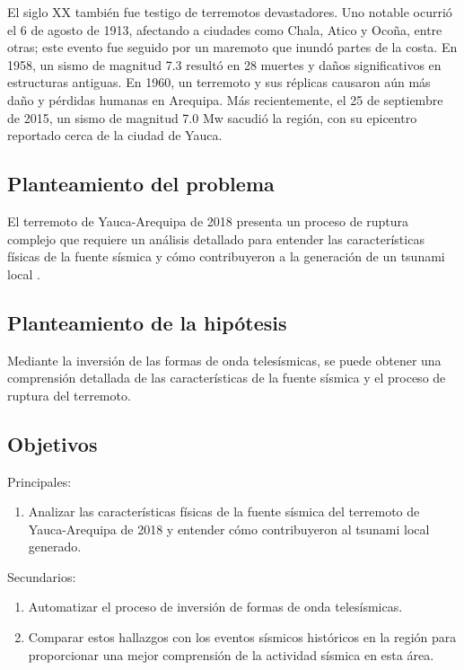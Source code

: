 \documentclass[a4paper,11pt]{article}
\begin{document}
El siglo XX también fue testigo de terremotos devastadores. Uno notable ocurrió el 6 de agosto de 1913, afectando a ciudades como Chala, Atico y Ocoña, entre otras; este evento fue seguido por un maremoto que inundó partes de la costa. En 1958, un sismo de magnitud 7.3 resultó en 28 muertes y daños significativos en estructuras antiguas. En 1960, un terremoto y sus réplicas causaron aún más daño y pérdidas humanas en Arequipa. Más recientemente, el 25 de septiembre de 2015, un sismo de magnitud 7.0 Mw sacudió la región, con su epicentro reportado cerca de la ciudad de Yauca.

\subsection*{Planteamiento del problema}

El terremoto de Yauca-Arequipa de 2018 presenta un proceso de ruptura complejo que requiere un análisis detallado para entender las características físicas de la fuente sísmica y cómo contribuyeron a la generación de un tsunami local \cite{CEN13}.

\subsection*{Planteamiento de la hipótesis}

Mediante la inversión de las formas de onda telesísmicas, se puede obtener una comprensión detallada de las características de la fuente sísmica y el proceso de ruptura del terremoto.

\subsection*{Objetivos}

Principales:

\begin{enumerate}
  \item Analizar las características físicas de la fuente sísmica del terremoto de Yauca-Arequipa de 2018 y entender cómo contribuyeron al tsunami local generado.
\end{enumerate}

Secundarios:

\begin{enumerate}
  \item Automatizar el proceso de inversión de formas de onda telesísmicas.
  \item Comparar estos hallazgos con los eventos sísmicos históricos en la región para proporcionar una mejor comprensión de la actividad sísmica en esta área.
\end{enumerate}
\end{document}
